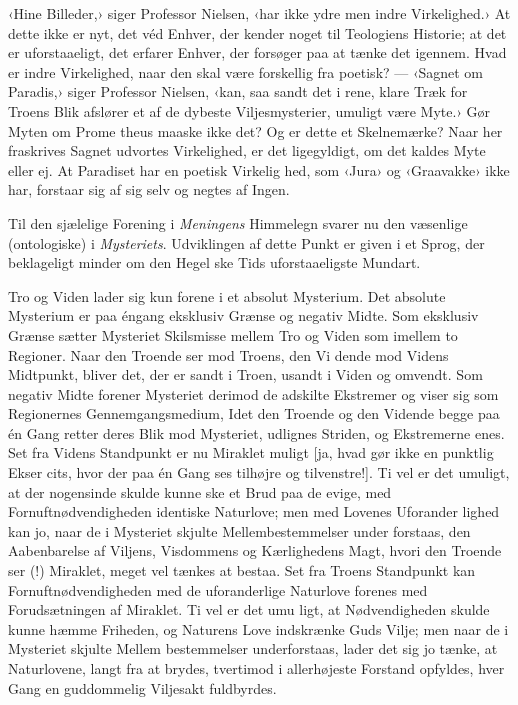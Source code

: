 \documentclass[12pt,a4paper,openany]{book}
\newcommand{\opage}[1]{\marginnote{\footnotesize\textit{[#1]}}}
\begin{document}
‹Hine Billeder,› siger Professor Nielsen, ‹har ikke ydre men
indre Virkelighed.› At dette ikke er nyt, det véd Enhver, der
kender noget til Teologiens Historie; at det er uforstaaeligt, det
erfarer Enhver, der forsøger paa at tænke det igennem. Hvad
er indre Virkelighed, naar den skal være forskellig fra poetisk?
--- ‹Sagnet om Paradis,› siger Professor Nielsen, ‹kan, saa sandt
det i rene, klare Træk for Troens Blik afslører et af de dybeste
Viljesmysterier, umuligt være Myte.› Gør Myten om Prome\-%
theus maaske ikke det? Og er dette et Skelnemærke? Naar her
fraskrives Sagnet udvortes Virkelighed, er det ligegyldigt, om
det kaldes Myte eller ej. At Paradiset har en poetisk Virkelig\-%
hed, som ‹Jura› og ‹Graavakke› ikke har, forstaar sig af sig
selv og negtes af Ingen.

Til den sjælelige Forening i \emph{Meningens} Himmelegn svarer
nu den væsenlige (ontologiske) i \emph{Mysteriets}. Udviklingen af dette
Punkt er given i et Sprog, der beklageligt minder om den Hegel\-%
ske Tids uforstaaeligste Mundart.

{\small
\opage{90}Tro og Viden lader sig kun forene i et absolut Mysterium. Det
absolute Mysterium er paa éngang eksklusiv Grænse og negativ Midte.
Som eksklusiv Grænse sætter Mysteriet Skilsmisse mellem Tro og Viden
som imellem to Regioner. Naar den Troende ser mod Troens, den Vi\-%
dende mod Videns Midtpunkt, bliver det, der er sandt i Troen, usandt i
Viden og omvendt. Som negativ Midte forener Mysteriet derimod de
adskilte Ekstremer og viser sig som Regionernes Gennemgangsmedium,
Idet den Troende og den Vidende begge paa én Gang retter deres Blik
mod Mysteriet, udlignes Striden, og Ekstremerne enes. Set fra Videns
Standpunkt er nu Miraklet muligt [ja, hvad gør ikke en punktlig Ekser\-%
cits, hvor der paa én Gang ses tilhøjre og tilvenstre!]. Ti vel er det
umuligt, at der nogensinde skulde kunne ske et Brud paa de evige, med
Fornuftnødvendigheden identiske Naturlove; men med Lovenes Uforander\-%
lighed kan jo, naar de i Mysteriet skjulte Mellembestemmelser under\-%
forstaas, den Aabenbarelse af Viljens, Visdommens og Kærlighedens Magt,
hvori den Troende ser (!) Miraklet, meget vel tænkes at bestaa. Set fra
Troens Standpunkt kan Fornuftnødvendigheden med de uforanderlige
Naturlove forenes med Forudsætningen af Miraklet. Ti vel er det umu\-%
ligt, at Nødvendigheden skulde kunne hæmme Friheden, og Naturens
Love indskrænke Guds Vilje; men naar de i Mysteriet skjulte Mellem\-%
bestemmelser underforstaas, lader det sig jo tænke, at Naturlovene, langt
fra at brydes, tvertimod i allerhøjeste Forstand opfyldes, hver Gang en
guddommelig Viljesakt fuldbyrdes.\par}
\end{document}
